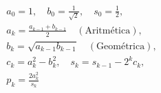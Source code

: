 \documentclass[preview]{standalone}
\begin{document}
\begin{align*}
a_0 = 1, \quad b_0 = \frac{1}{\sqrt{2}}, \quad s_0 = \frac{1}{2}, \\a_k = \frac{a_{k-1} + b_{k-1}}{2} \quad (\text{Aritmética}), \\b_k = \sqrt{a_{k-1} b_{k-1}} \quad (\text{Geométrica}), \\c_k = a_k^2 - b_k^2, \quad s_k = s_{k-1} - 2^k c_k, \\p_k = \frac{2 a_k^2}{s_k}
\end{align*}
\end{document}
